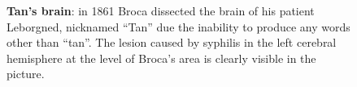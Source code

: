 \begin{figure}[htbp]
	\centering

	\caption[Tan's brain]{\textbf{Tan's brain}:
	in 1861 Broca dissected the brain of his patient Leborgned, nicknamed ``Tan''
	due the inability to produce any words other than ``tan''.
	The lesion caused by syphilis in the left cerebral
	hemisphere at the level of Broca's area is clearly visible in the picture.}
	\label{fig:speech:tan}
\end{figure}
